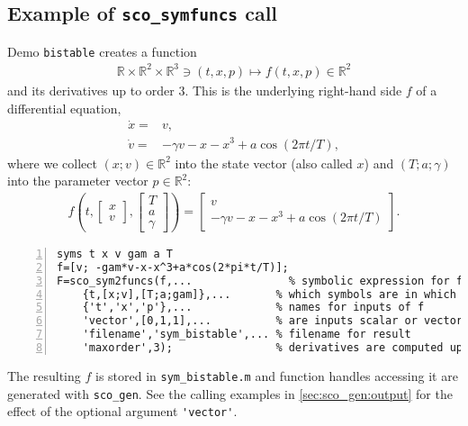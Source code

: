 \documentclass[11pt]{scrartcl}
\newcommand{\blist}[1]{\mbox{\lstinline!#1!}}
\newcommand{\R}{\mathbb{R}}
\begin{document}
\subsection{Example of \blist{sco_symfuncs} call} Demo
\texttt{bistable} creates a function
\begin{align*}
  \R\times\R^2\times\R^3\ni(t,x,p)\mapsto f(t,x,p)\in\R^2
\end{align*}
and its derivatives up to order $3$. This is the underlying right-hand
side $f$ of a differential equation,
\begin{align*}
  \dot x=&v,\\\dot v=&-\gamma v-x-x^3+a\cos(2\pi t/T),
\end{align*}
where we collect $(x;v)\in\R^2$ into the state vector (also called $x$) and
$(T;a;\gamma)$ into the parameter vector $p\in\R^2$:
\begin{align*}
  f\left(t,
    \begin{bmatrix}
      x\\v
    \end{bmatrix},
    \begin{bmatrix}
      T\\a\\\gamma
    \end{bmatrix}\right)=
    \begin{bmatrix}
      v\\
      -\gamma v-x-x^3+a\cos(2\pi t/T)
    \end{bmatrix}.
\end{align*}
\begin{lstlisting}[frame=lines,numbers=left]
syms t x v gam a T 
f=[v; -gam*v-x-x^3+a*cos(2*pi*t/T)]; 
F=sco_sym2funcs(f,...               % symbolic expression for f
    {t,[x;v],[T;a;gam]},...       % which symbols are in which inputs of f
    {'t','x','p'},...             % names for inputs of f
    'vector',[0,1,1],...          % are inputs scalar or vectors
    'filename','sym_bistable',... % filename for result
    'maxorder',3);                % derivatives are computed up to this order
\end{lstlisting}
The resulting $f$ is stored in \texttt{sym\_bistable.m} and function
handles accessing it are generated with \blist{sco_gen}. See the
calling examples in \cref{sec:sco_gen:output} for the effect of the
optional argument \blist{'vector'}.
\end{document}
